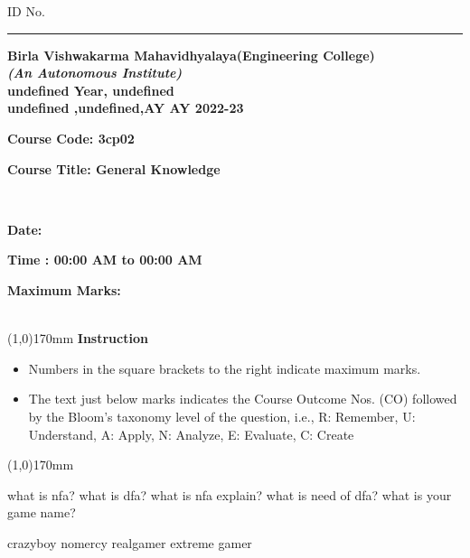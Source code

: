 \documentclass[addpoints,12pt]{exam}
\begin{document}
    \hspace{-7mm}ID No.\rule{20mm}{0.3mm}
    \begin{center}
 \textbf{Birla Vishwakarma Mahavidhyalaya(Engineering College)} \\
  \textbf{\textit{(An Autonomous Institute)}} \\
  \textbf{undefined Year, undefined} \\
  \textbf{undefined ,undefined,AY AY 2022-23} \\
  \vspace{4mm}
 
 
  \end{center}
 
  \hspace{-7mm}
  \parbox[t]{50mm}{\textbf{Course Code: 3cp02}}
  \parbox[t]{100mm}{\textbf{Course Title: General Knowledge}}\vspace{2mm}\\
  \parbox[t]{50mm}{\textbf{Date: }}
  \parbox[t]{75mm}{\textbf{Time : 00:00 AM to 00:00 AM}}
  \parbox[t]{50mm}{\textbf{Maximum Marks: }}\\
  \line(1,0){170mm} \vspace{2mm}
  \hspace{-6mm}\textbf{Instruction}

 

  \begin{itemize}[leftmargin=4mm,rightmargin=-2cm]
      \item Numbers in the square brackets to the right indicate maximum marks.
     
      \item The text just below marks indicates the Course Outcome Nos. (CO) followed by the Bloom’s taxonomy level of the question, i.e., R: Remember, U: Understand, A: Apply, N: Analyze, E: Evaluate, C: Create
  \end{itemize}
  \line(1,0){170mm}
 \vspace{5mm}
\begin{questions}
\pointname{}
\pointsinrightmargin
{}\question[5]
what is nfa?
\question[5]
what is dfa?
\question[5]
what is nfa explain?
\question[5]
what is need of dfa?
\question[5]
what is your game name?
\vspace{1.5mm}
\begin{oneparchoices}
\choice crazyboy
\choice nomercy
\choice realgamer
\choice extreme gamer
\end{oneparchoices}
\vspace{1.5mm}
\end{questions}
\end{document}
